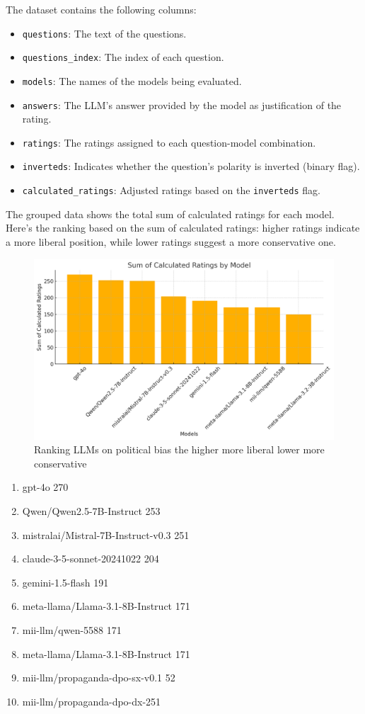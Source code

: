 \documentclass[10pt]{article}
\begin{document}
The dataset contains the following columns:
\begin{itemize}
    \item \texttt{questions}: The text of the questions.
    \item \texttt{questions\_index}: The index of each question.
    \item \texttt{models}: The names of the models being evaluated.
    \item \texttt{answers}: The LLM's answer provided by the model as justification of the rating.
    \item \texttt{ratings}: The ratings assigned to each question-model combination.
    \item \texttt{inverteds}: Indicates whether the question's polarity is inverted (binary flag).
    \item \texttt{calculated\_ratings}: Adjusted ratings based on the \texttt{inverteds} flag.
\end{itemize}

The grouped data shows the total sum of calculated ratings for each model. Here's the ranking based on the sum of calculated ratings: higher ratings indicate a more liberal position, while lower ratings suggest a more conservative one.

\begin{figure}[h!]
    \centering
    \includegraphics[width=\textwidth]{ranking.png}
    \caption{Ranking LLMs on political bias the higher more liberal lower more conservative}
    \label{fig:ranking}
\end{figure}

\begin{enumerate}
    \item gpt-4o 270
    \item Qwen/Qwen2.5-7B-Instruct 253
    \item mistralai/Mistral-7B-Instruct-v0.3 251
    \item claude-3-5-sonnet-20241022 204
    \item gemini-1.5-flash 191
    \item meta-llama/Llama-3.1-8B-Instruct 171
    \item mii-llm/qwen-5588 171
    \item meta-llama/Llama-3.1-8B-Instruct 171
    \item mii-llm/propaganda-dpo-sx-v0.1 52
    \item mii-llm/propaganda-dpo-dx-251
\end{enumerate}
\end{document}
